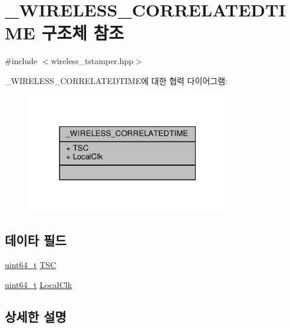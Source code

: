 \hypertarget{struct___w_i_r_e_l_e_s_s___c_o_r_r_e_l_a_t_e_d_t_i_m_e}{}\section{\+\_\+\+W\+I\+R\+E\+L\+E\+S\+S\+\_\+\+C\+O\+R\+R\+E\+L\+A\+T\+E\+D\+T\+I\+ME 구조체 참조}
\label{struct___w_i_r_e_l_e_s_s___c_o_r_r_e_l_a_t_e_d_t_i_m_e}


{\ttfamily \#include $<$wireless\+\_\+tstamper.\+hpp$>$}



\+\_\+\+W\+I\+R\+E\+L\+E\+S\+S\+\_\+\+C\+O\+R\+R\+E\+L\+A\+T\+E\+D\+T\+I\+M\+E에 대한 협력 다이어그램\+:
\nopagebreak
\begin{figure}[H]
\begin{center}
\leavevmode
\includegraphics[width=253pt]{struct___w_i_r_e_l_e_s_s___c_o_r_r_e_l_a_t_e_d_t_i_m_e__coll__graph}
\end{center}
\end{figure}
\subsection*{데이타 필드}
\begin{DoxyCompactItemize}
\item 
\hyperlink{parse_8c_aec6fcb673ff035718c238c8c9d544c47}{uint64\+\_\+t} \hyperlink{struct___w_i_r_e_l_e_s_s___c_o_r_r_e_l_a_t_e_d_t_i_m_e_a14af96e5d92a73608a9c4999feee9349}{T\+SC}
\item 
\hyperlink{parse_8c_aec6fcb673ff035718c238c8c9d544c47}{uint64\+\_\+t} \hyperlink{struct___w_i_r_e_l_e_s_s___c_o_r_r_e_l_a_t_e_d_t_i_m_e_a18b6219538a583d472d0057f0828b35e}{Local\+Clk}
\end{DoxyCompactItemize}


\subsection{상세한 설명}


